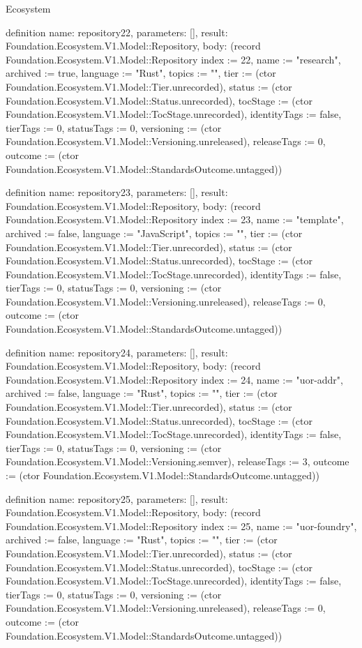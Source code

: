 \begin{lexlean}{Ecosystem}
\begin{semanticmodule}
definition{
  name: repository22,
  parameters: [],
  result: Foundation.Ecosystem.V1.Model::Repository,
  body: (record Foundation.Ecosystem.V1.Model::Repository {index := 22, name := "research", archived := true, language := "Rust", topics := "", tier := (ctor Foundation.Ecosystem.V1.Model::Tier.unrecorded), status := (ctor Foundation.Ecosystem.V1.Model::Status.unrecorded), tocStage := (ctor Foundation.Ecosystem.V1.Model::TocStage.unrecorded), identityTags := false, tierTags := 0, statusTags := 0, versioning := (ctor Foundation.Ecosystem.V1.Model::Versioning.unreleased), releaseTags := 0, outcome := (ctor Foundation.Ecosystem.V1.Model::StandardsOutcome.untagged)})
}

definition{
  name: repository23,
  parameters: [],
  result: Foundation.Ecosystem.V1.Model::Repository,
  body: (record Foundation.Ecosystem.V1.Model::Repository {index := 23, name := "template", archived := false, language := "JavaScript", topics := "", tier := (ctor Foundation.Ecosystem.V1.Model::Tier.unrecorded), status := (ctor Foundation.Ecosystem.V1.Model::Status.unrecorded), tocStage := (ctor Foundation.Ecosystem.V1.Model::TocStage.unrecorded), identityTags := false, tierTags := 0, statusTags := 0, versioning := (ctor Foundation.Ecosystem.V1.Model::Versioning.unreleased), releaseTags := 0, outcome := (ctor Foundation.Ecosystem.V1.Model::StandardsOutcome.untagged)})
}

definition{
  name: repository24,
  parameters: [],
  result: Foundation.Ecosystem.V1.Model::Repository,
  body: (record Foundation.Ecosystem.V1.Model::Repository {index := 24, name := "uor-addr", archived := false, language := "Rust", topics := "", tier := (ctor Foundation.Ecosystem.V1.Model::Tier.unrecorded), status := (ctor Foundation.Ecosystem.V1.Model::Status.unrecorded), tocStage := (ctor Foundation.Ecosystem.V1.Model::TocStage.unrecorded), identityTags := false, tierTags := 0, statusTags := 0, versioning := (ctor Foundation.Ecosystem.V1.Model::Versioning.semver), releaseTags := 3, outcome := (ctor Foundation.Ecosystem.V1.Model::StandardsOutcome.untagged)})
}

definition{
  name: repository25,
  parameters: [],
  result: Foundation.Ecosystem.V1.Model::Repository,
  body: (record Foundation.Ecosystem.V1.Model::Repository {index := 25, name := "uor-foundry", archived := false, language := "Rust", topics := "", tier := (ctor Foundation.Ecosystem.V1.Model::Tier.unrecorded), status := (ctor Foundation.Ecosystem.V1.Model::Status.unrecorded), tocStage := (ctor Foundation.Ecosystem.V1.Model::TocStage.unrecorded), identityTags := false, tierTags := 0, statusTags := 0, versioning := (ctor Foundation.Ecosystem.V1.Model::Versioning.unreleased), releaseTags := 0, outcome := (ctor Foundation.Ecosystem.V1.Model::StandardsOutcome.untagged)})
}


\end{semanticmodule}
\end{lexlean}
